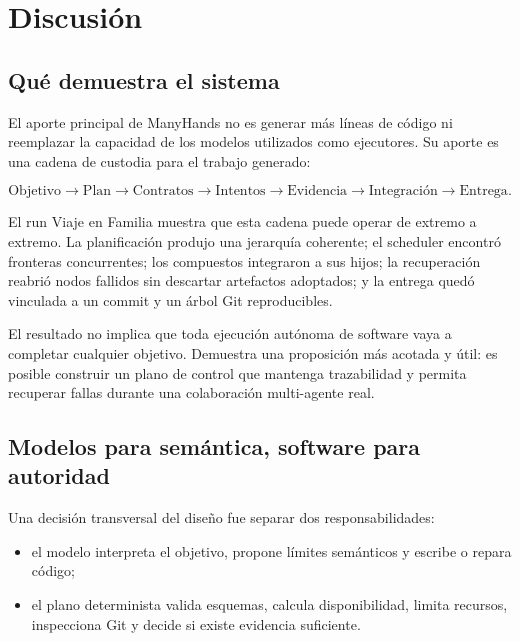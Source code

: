 \chapter{Discusión}
\label{cap:discusion}

\section{Qué demuestra el sistema}

El aporte principal de ManyHands no es generar más líneas de código ni reemplazar
la capacidad de los modelos utilizados como ejecutores. Su aporte es una cadena
de custodia para el trabajo generado:

\begin{equation}
\text{Objetivo} \rightarrow \text{Plan} \rightarrow \text{Contratos}
\rightarrow \text{Intentos} \rightarrow \text{Evidencia}
\rightarrow \text{Integración} \rightarrow \text{Entrega}.
\label{eq:cadena-custodia}
\end{equation}

El run Viaje en Familia muestra que esta cadena puede operar de extremo a
extremo. La planificación produjo una jerarquía coherente; el scheduler encontró
fronteras concurrentes; los compuestos integraron a sus hijos; la recuperación
reabrió nodos fallidos sin descartar artefactos adoptados; y la entrega quedó
vinculada a un commit y un árbol Git reproducibles.

El resultado no implica que toda ejecución autónoma de software vaya a
completar cualquier objetivo. Demuestra una proposición más acotada y útil: es
posible construir un plano de control que mantenga trazabilidad y permita
recuperar fallas durante una colaboración multi-agente real.

\section{Modelos para semántica, software para autoridad}

Una decisión transversal del diseño fue separar dos responsabilidades:

\begin{itemize}
  \item el modelo interpreta el objetivo, propone límites semánticos y escribe
  o repara código;
  \item el plano determinista valida esquemas, calcula disponibilidad, limita
  recursos, inspecciona Git y decide si existe evidencia suficiente.
\end{itemize}

